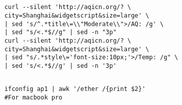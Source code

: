 \documentclass[12pt,a4paper]{article}
\theoremstyle{definition}
\begin{document}
\subsection{}
  \begin{lstlisting}
    curl --silent 'http://aqicn.org/? \
    city=Shanghai&widgetscript&size=large' \
    | sed 's/^.*title\=\\"Moderate\\">/AQ: /g' \
    | sed "s/<.*$//g" | sed -n "3p"
    curl --silent 'http://aqicn.org/? \
    city=Shanghai&widgetscript&size=large' \
    | sed "s/.*style\='font-size:10px;'>/Temp: /g" \
    | sed 's/<.*$//g' | sed -n '3p'
  \end{lstlisting}
\subsection{}
  \begin{lstlisting}
    ifconfig ap1 | awk '/ether /{print $2}'
    #For macbook pro 
  \end{lstlisting}
\end{document}
